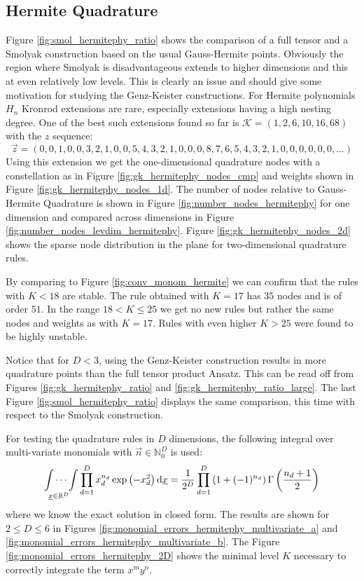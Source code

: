 \documentclass[a4paper,10pt]{article}
\begin{document}
\FloatBarrier
\subsection{Hermite Quadrature}

Figure \ref{fig:smol_hermitephy_ratio} shows the comparison of a full tensor
and a Smolyak construction based on the usual Gauss-Hermite points. Obviously the region
where Smolyak is disadvantageous extends to higher dimensions and this at even relatively
low levels. This is clearly an issue and should give some motivation for studying the
Genz-Keister constructions.
For Hermite polynomials $H_n$ Kronrod extensions are rare, especially extensions
having a high nesting degree. One of the best such extensions found so far is
$\mathcal{K} = (1, 2, 6, 10, 16, 68)$ with the $z$ sequence:
\begin{equation*}
  \vec{z} = (0, 0, 1, 0, 0, 3, 2, 1, 0, 0, 5, 4, 3, 2, 1, 0, 0, 0, 8, 7,
             6, 5, 4, 3, 2, 1, 0, 0, 0, 0, 0, 0, \ldots)
\end{equation*}
Using this extension we get the one-dimensional quadrature nodes
with a constellation as in Figure \ref{fig:gk_hermitephy_nodes_cmp}
and weights shown in Figure \ref{fig:gk_hermitephy_nodes_1d}.
The number of nodes relative to Gauss-Hermite Quadrature is shown
in Figure \ref{fig:number_nodes_hermitephy} for one dimension and
compared across dimensions in Figure \ref{fig:number_nodes_levdim_hermitephy}.
Figure \ref{fig:gk_hermitephy_nodes_2d} shows the sparse
node distribution in the plane for two-dimensional quadrature rules.

By comparing to Figure \ref{fig:conv_monom_hermite} we can confirm that the
rules with $K < 18$ are stable. The rule obtained with $K=17$ has $35$ nodes
and is of order $51$. In the range $18 < K \leq 25$ we get no new rules but
rather the same nodes and weights as with $K = 17$. Rules with even higher
$K > 25$ were found to be highly unstable.

Notice that for $D < 3$, using the Genz-Keister construction results
in more quadrature points than the full tensor product Ansatz. This
can be read off from Figures \ref{fig:gk_hermitephy_ratio}
and \ref{fig:gk_hermitephy_ratio_large}. The last Figure
\ref{fig:smol_hermitephy_ratio} displays the same comparison,
this time with respect to the Smolyak construction.

For testing the quadrature rules in $D$ dimensions, the following integral
over multi-variate monomials with $\vec{n} \in \mathbb{N}_0^D$ is used:
\begin{equation} \label{eq:hermitephy_exact_solution}
  \idotsint \limits_{\underline{x} \in \mathbb{R}^D} \prod_{d=1}^D x_d^{n_d} \exp\left(-x_d^2\right) \mathrm{d}\underline{x}
  =
  \frac{1}{2^D} \prod_{d=1}^D \left(1 + (-1)^{n_d}\right) \Gamma\left(\frac{n_d + 1}{2}\right)
\end{equation}
where we know the exact solution in closed form. The results are shown
for $2 \leq D \leq 6$ in Figures \ref{fig:monomial_errors_hermitephy_multivariate_a}
and \ref{fig:monomial_errors_hermitephy_multivariate_b}.
The Figure \ref{fig:monomial_errors_hermitephy_2D} shows the minimal
level $K$ necessary to correctly integrate the term $x^m y^n$.
\end{document}
